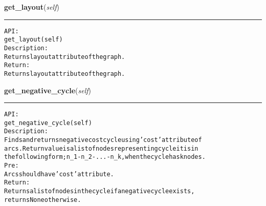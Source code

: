     \vspace{0.5ex}

\hspace{.8\funcindent}\begin{boxedminipage}{\funcwidth}

    \raggedright \textbf{get\_layout}(\textit{self})

    \vspace{-1.5ex}

    \rule{\textwidth}{0.5\fboxrule}
\setlength{\parskip}{2ex}
\begin{alltt}

API:
    get\_layout(self)
Description:
Returns layout attribute of the graph.
Return:
    Returns layout attribute of the graph.
\end{alltt}

\setlength{\parskip}{1ex}
    \end{boxedminipage}

    \label{coinor:gimpy:graph:Graph:get_negative_cycle}

    \vspace{0.5ex}

\hspace{.8\funcindent}\begin{boxedminipage}{\funcwidth}

    \raggedright \textbf{get\_negative\_cycle}(\textit{self})

    \vspace{-1.5ex}

    \rule{\textwidth}{0.5\fboxrule}
\setlength{\parskip}{2ex}
\begin{alltt}

API:
    get\_negative\_cycle(self)
Description:
    Finds and returns negative cost cycle using 'cost' attribute of
    arcs. Return value is a list of nodes representing cycle it is in
    the following form; n\_1-n\_2-...-n\_k, when the cycle has k nodes.
Pre:
    Arcs should have 'cost' attribute.
Return:
    Returns a list of nodes in the cycle if a negative cycle exists,
    returns None otherwise.
\end{alltt}

\setlength{\parskip}{1ex}
    \end{boxedminipage}

    \label{coinor:gimpy:graph:Graph:get_neighbors}

